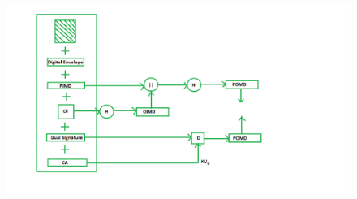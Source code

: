 \begin{figure}[ht]
        \centering
        \includegraphics[scale=0.8]{../IMAGES/Purchase-Request-Validation.png}
        \label{prval}
    \end{figure}

